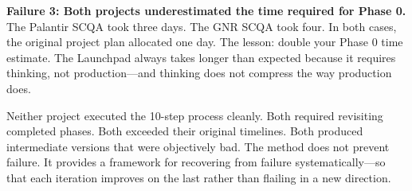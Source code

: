 \textbf{Failure 3: Both projects underestimated the time required for Phase 0.} The Palantir SCQA took three days. The GNR SCQA took four. In both cases, the original project plan allocated one day. The lesson: double your Phase 0 time estimate. The Launchpad always takes longer than expected because it requires thinking, not production---and thinking does not compress the way production does.

\begin{alertbox}
Neither project executed the 10-step process cleanly. Both required revisiting completed phases. Both exceeded their original timelines. Both produced intermediate versions that were objectively bad. The method does not prevent failure. It provides a framework for recovering from failure systematically---so that each iteration improves on the last rather than flailing in a new direction.
\end{alertbox}


\clearpage
